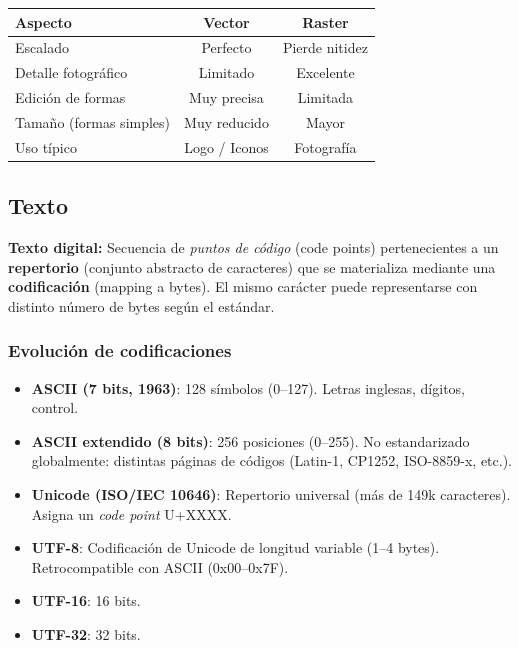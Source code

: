 \documentclass[11pt,a4paper]{article}
\begin{document}
\begin{center}
\renewcommand{\arraystretch}{1.25}
\begin{tabular}{|l|c|c|}
\hline
\textbf{Aspecto} & \textbf{Vector} & \textbf{Raster} \\
\hline
Escalado & Perfecto & Pierde nitidez \\
Detalle fotográfico & Limitado & Excelente \\
Edición de formas & Muy precisa & Limitada \\
Tamaño (formas simples) & Muy reducido & Mayor \\
Uso típico & Logo / Iconos & Fotografía \\
\hline
\end{tabular}
\end{center}

\subsection{Texto}

\begin{DefBox}
\textbf{Texto digital:} Secuencia de \emph{puntos de código} (code points) pertenecientes a un \textbf{repertorio} (conjunto abstracto de caracteres) que se materializa mediante una \textbf{codificación} (mapping a bytes). El mismo carácter puede representarse con distinto número de bytes según el estándar.
\end{DefBox}

\subsubsection*{Evolución de codificaciones}
\begin{itemize}[leftmargin=1.4em]
	\item \textbf{ASCII (7 bits, 1963)}: 128 símbolos (0–127). Letras inglesas, dígitos, control.
	\item \textbf{ASCII extendido (8 bits)}: 256 posiciones (0–255). No estandarizado globalmente: distintas páginas de códigos (Latin-1, CP1252, ISO-8859-x, etc.).
	\item \textbf{Unicode (ISO/IEC 10646)}: Repertorio universal (más de 149k caracteres). Asigna un \emph{code point} U+XXXX.
	\item \textbf{UTF-8}: Codificación de Unicode de longitud variable (1–4 bytes). Retrocompatible con ASCII (0x00–0x7F).
	\item \textbf{UTF-16}: 16 bits.
	\item \textbf{UTF-32}: 32 bits.
\end{itemize}
\end{document}
